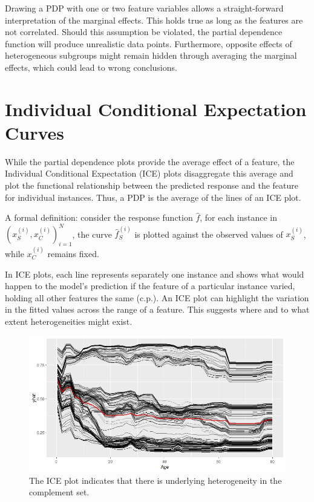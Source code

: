 \documentclass[
]{krantz}
\begin{document}
Drawing a PDP with one or two feature variables allows a straight-forward interpretation of the marginal effects. This holds true as long as the features are not correlated. Should this assumption be violated, the partial dependence function will produce unrealistic data points. Furthermore, opposite effects of heterogeneous subgroups might remain hidden through averaging the marginal effects, which could lead to wrong conclusions.\citep{molnar2019}

\hypertarget{individual-conditional-expectation-curves}{%
\section{Individual Conditional Expectation Curves}\label{individual-conditional-expectation-curves}}

While the partial dependence plots provide the average effect of a feature, the Individual Conditional Expectation (ICE) plots disaggregate this average and plot the functional relationship between the predicted response and the feature for individual instances. Thus, a PDP is the average of the lines of an ICE plot.\citep{molnar2019}

A formal definition: consider the response function \(\hat{f}\), for each instance in \({(x^{(i)}_S, x^{(i)}_C)}^N_{i=1}\), the curve \(\hat{f}_S^{(i)}\) is plotted against the observed values of \(x^{(i)}_S\), while \(x^{(i)}_C\) remains fixed.\citep{molnar2019}\citep{Goldstein2013}

In ICE plots, each line represents separately one instance and shows what would happen to the model's prediction if the feature of a particular instance varied, holding all other features the same (c.p.). An ICE plot can highlight the variation in the fitted values across the range of a feature. This suggests where and to what extent heterogeneities might exist.

\begin{figure}
\includegraphics[width=0.8\linewidth]{images/ice_plot} \caption{The ICE plot indicates that there is underlying heterogeneity in the complement set.}\label{fig:unnamed-chunk-5}
\end{figure}
\end{document}
